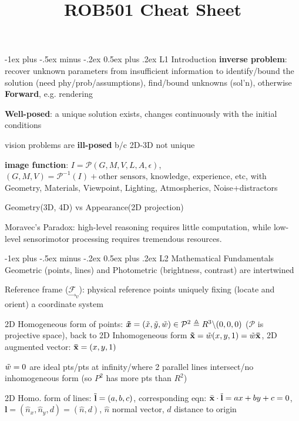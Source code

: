 \documentclass[10pt,landscape]{article}
\title{ROB501 Cheat Sheet}
\makeatletter
\renewcommand{\section}{\@startsection{section}{1}{0mm}%
                                {-1ex plus -.5ex minus -.2ex}%
                                {0.5ex plus .2ex}%
                                {\normalfont\large\bfseries}}
\makeatother
\begin{document}
\raggedright
\footnotesize

\begin{multicols}{3}
\setlength{\premulticols}{1pt}
\setlength{\postmulticols}{1pt}
\setlength{\multicolsep}{1pt}
\setlength{\columnsep}{2pt}

\section{L1 Introduction}
\textbf{inverse problem}: recover unknown parameters from insufficient information to identify/bound the solution (need phy/prob/assumptions), find/bound unknowns (sol’n), otherwise \textbf{Forward}, e.g. rendering

\textbf{Well-posed}:  a unique solution exists, changes continuously with the initial conditions

vision problems are \textbf{ill-posed} b/c 2D-3D not unique

\textbf{image function}: $I = \mathcal{P}(G, M, V, L, A, \epsilon)$, $(G, M, V) = \mathcal{P}^{-1}(I) + \text{other sensors, knowledge, experience, etc}$, with Geometry, Materials, Viewpoint, Lighting, Atmospherics, Noise+distractors

Geometry(3D, 4D) vs Appearance(2D projection)

Moravec's Paradox: high-level reasoning requires little computation, while low-level sensorimotor processing requires tremendous resources.

\section{L2 Mathematical Fundamentals}
Geometric (points, lines) and Photometric (brightness, contrast) are intertwined

Reference frame ($\underset{\rightarrow}{\mathcal{F}}_v$): physical reference points uniquely fixing (locate and orient) a coordinate system

2D Homogeneous form of points: $\bm{\Tilde{x}} = (\Tilde{x}, \Tilde{y}, \Tilde{w})\in \mathcal{P}^2 \triangleq R^3 \backslash (0,0,0)$ ($\mathcal{P}$ is projective space), back to 2D Inhomogeneous form $\mathbf{\Tilde{x}} = \Tilde{w}(x, y, 1) = \Tilde{w}\mathbf{\Bar{x}}$, 2D augmented vector:  $\mathbf{\Bar{x}} = (x, y, 1)$

$\Tilde{w}=0$ are ideal pts/pts at infinity/where 2 parallel lines intersect/no inhomogeneous form (so $P^2$ has more pts than $R^2$)

2D Homo. form of lines: $\Tilde{\mathbf{l}} = (a,b,c)$, corresponding eqn: $\Bar{\mathbf{x}}\cdot \Tilde{\mathbf{l}} = ax + by +c=0$, $\mathbf{l}=(\hat{n}_x, \hat{n}_y,d) = (\hat{n}, d)$, $\hat{n}$ normal vector, $d$ distance to origin


\end{multicols}
\end{document}
